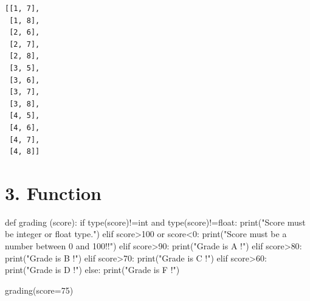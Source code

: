 \documentclass[
  a4paper,
  DIV=11,
  numbers=noendperiod]{scrreprt}
\newenvironment{Shaded}{\begin{snugshade}}{\end{snugshade}}
\newcommand{\BuiltInTok}[1]{\textcolor[rgb]{0.00,0.23,0.31}{#1}}
\newcommand{\ControlFlowTok}[1]{\textcolor[rgb]{0.00,0.23,0.31}{#1}}
\newcommand{\DecValTok}[1]{\textcolor[rgb]{0.68,0.00,0.00}{#1}}
\newcommand{\KeywordTok}[1]{\textcolor[rgb]{0.00,0.23,0.31}{#1}}
\newcommand{\NormalTok}[1]{\textcolor[rgb]{0.00,0.23,0.31}{#1}}
\newcommand{\OperatorTok}[1]{\textcolor[rgb]{0.37,0.37,0.37}{#1}}
\newcommand{\StringTok}[1]{\textcolor[rgb]{0.13,0.47,0.30}{#1}}
\begin{document}
\begin{verbatim}
[[1, 7],
 [1, 8],
 [2, 6],
 [2, 7],
 [2, 8],
 [3, 5],
 [3, 6],
 [3, 7],
 [3, 8],
 [4, 5],
 [4, 6],
 [4, 7],
 [4, 8]]
\end{verbatim}

\section*{3. Function}\label{function}


\begin{Shaded}
\begin{Highlighting}[]
\KeywordTok{def}\NormalTok{ grading (score):}
    \ControlFlowTok{if} \BuiltInTok{type}\NormalTok{(score)}\OperatorTok{!=}\BuiltInTok{int} \KeywordTok{and} \BuiltInTok{type}\NormalTok{(score)}\OperatorTok{!=}\BuiltInTok{float}\NormalTok{:}
        \BuiltInTok{print}\NormalTok{(}\StringTok{"Score must be integer or float type."}\NormalTok{)}
    \ControlFlowTok{elif}\NormalTok{ score}\OperatorTok{\textgreater{}}\DecValTok{100} \KeywordTok{or}\NormalTok{ score}\OperatorTok{\textless{}}\DecValTok{0}\NormalTok{:}
        \BuiltInTok{print}\NormalTok{(}\StringTok{"Score must be a number between 0 and 100!!"}\NormalTok{)}
    \ControlFlowTok{elif}\NormalTok{ score}\OperatorTok{\textgreater{}}\DecValTok{90}\NormalTok{:}
        \BuiltInTok{print}\NormalTok{(}\StringTok{"Grade is A !"}\NormalTok{)}
    \ControlFlowTok{elif}\NormalTok{ score}\OperatorTok{\textgreater{}}\DecValTok{80}\NormalTok{:}
        \BuiltInTok{print}\NormalTok{(}\StringTok{"Grade is B !"}\NormalTok{)}
    \ControlFlowTok{elif}\NormalTok{ score}\OperatorTok{\textgreater{}}\DecValTok{70}\NormalTok{:}
        \BuiltInTok{print}\NormalTok{(}\StringTok{"Grade is C !"}\NormalTok{)}
    \ControlFlowTok{elif}\NormalTok{ score}\OperatorTok{\textgreater{}}\DecValTok{60}\NormalTok{:}
        \BuiltInTok{print}\NormalTok{(}\StringTok{"Grade is D !"}\NormalTok{)}
    \ControlFlowTok{else}\NormalTok{:}
        \BuiltInTok{print}\NormalTok{(}\StringTok{"Grade is F !"}\NormalTok{)}
\end{Highlighting}
\end{Shaded}

\begin{Shaded}
\begin{Highlighting}[]
\NormalTok{grading(score}\OperatorTok{=}\DecValTok{75}\NormalTok{)}
\end{Highlighting}
\end{Shaded}
\end{document}
